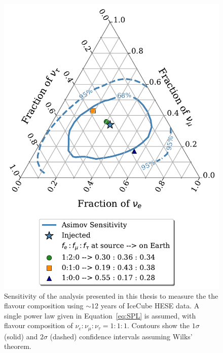 \begin{figure}[h!]
    \caption[Sensitivity to the astrophysical neutrino flavour composiition using 12 years of HESE data]{Sensitivity of the analysis presented in this thesis to measure the the flavour composition using $\sim12$ years of IceCube HESE data. A single power law given in Equation~\ref{eq:SPL} is assumed, with flavour composition of $\nu_e:\nu_{\mu}:\nu_{\tau}=1:1:1$. Contours show the $1\sigma$ (solid) and $2\sigma$ (dashed) confidence intervals assuming Wilks' theorem.}
    \includegraphics{./figures/Analysis/Asimov_Sensitivity.pdf}
\end{figure}

